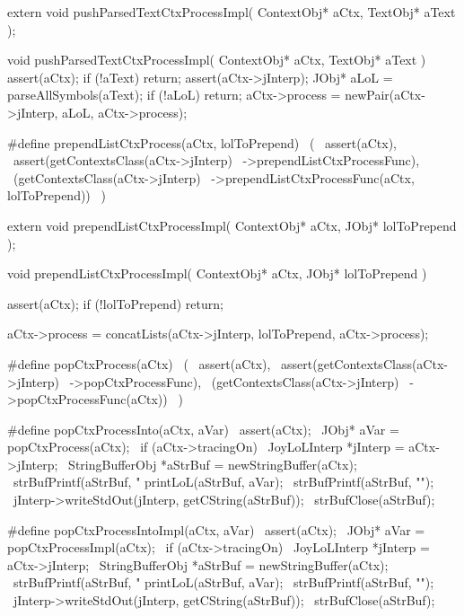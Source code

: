 \startCHeader
extern void pushParsedTextCtxProcessImpl(
  ContextObj* aCtx,
  TextObj* aText
);
\stopCHeader
{}

\startCCode
void pushParsedTextCtxProcessImpl(
  ContextObj* aCtx,
  TextObj* aText
) {
  assert(aCtx);
  if (!aText) return;
  assert(aCtx->jInterp);
  JObj* aLoL = parseAllSymbols(aText);
  if (!aLoL) return;
  aCtx->process = newPair(aCtx->jInterp, aLoL, aCtx->process);
}
\stopCCode

\startCHeader
#define prependListCtxProcess(aCtx, lolToPrepend)      \
  (                                                    \
    assert(aCtx),                                      \
    assert(getContextsClass(aCtx->jInterp)             \
      ->prependListCtxProcessFunc),                    \
    (getContextsClass(aCtx->jInterp)                   \
      ->prependListCtxProcessFunc(aCtx, lolToPrepend)) \
  )
\stopCHeader

\setCHeaderStream{private}
\startCHeader
extern void prependListCtxProcessImpl(
  ContextObj* aCtx,
  JObj* lolToPrepend
);
\stopCHeader
\setCHeaderStream{public}

\startCCode
void prependListCtxProcessImpl(
  ContextObj* aCtx,
  JObj* lolToPrepend
) {
  assert(aCtx);
  if (!lolToPrepend) return;

  aCtx->process =
    concatLists(aCtx->jInterp, lolToPrepend, aCtx->process);
}
\stopCCode

\startCHeader
#define popCtxProcess(aCtx)                    \
  (                                            \
    assert(aCtx),                              \
    assert(getContextsClass(aCtx->jInterp)     \
      ->popCtxProcessFunc),                    \
    (getContextsClass(aCtx->jInterp)           \
      ->popCtxProcessFunc(aCtx))               \
  )

#define popCtxProcessInto(aCtx, aVar)                  \
assert(aCtx);                                          \
JObj* aVar = popCtxProcess(aCtx);                      \
if (aCtx->tracingOn) {                                 \
  JoyLoLInterp *jInterp = aCtx->jInterp;               \
  StringBufferObj *aStrBuf = newStringBuffer(aCtx);    \
  strBufPrintf(aStrBuf, "%
  printLoL(aStrBuf, aVar);                             \
  strBufPrintf(aStrBuf, "\n");                         \
  jInterp->writeStdOut(jInterp, getCString(aStrBuf));  \
  strBufClose(aStrBuf);                                \
}

#define popCtxProcessIntoImpl(aCtx, aVar)              \
assert(aCtx);                                          \
JObj* aVar = popCtxProcessImpl(aCtx);                  \
if (aCtx->tracingOn) {                                 \
  JoyLoLInterp *jInterp = aCtx->jInterp;               \
  StringBufferObj *aStrBuf = newStringBuffer(aCtx);    \
  strBufPrintf(aStrBuf, "%
  printLoL(aStrBuf, aVar);                             \
  strBufPrintf(aStrBuf, "\n");                         \
  jInterp->writeStdOut(jInterp, getCString(aStrBuf));  \
  strBufClose(aStrBuf);                                \
}
\stopCHeader

